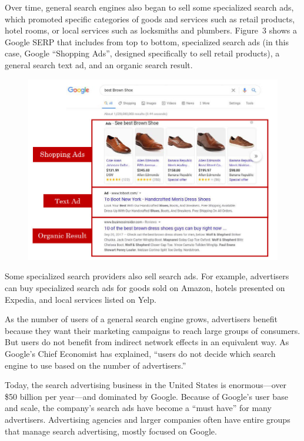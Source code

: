 \documentclass[11pt,b5paper,headings=small]{scrartcl}
\begin{document}
Over time, general search engines also began to sell some specialized search ads,
which promoted specific categories of goods and services such as retail products, 
hotel rooms, or local services such as locksmiths and plumbers. Figure~3 shows a 
Google SERP that includes from top to bottom, specialized search ads (in this case,
Google ``Shopping Ads'', designed specifically to sell retail products), a general 
search text ad, and an organic search result.

\begin{figure}[!ht]
\caption{}
\includegraphics{US-v-Google-Complaint-figures/fig3.png}
\end{figure}



Some specialized search providers also sell search ads. For example, advertisers
can buy specialized search ads for goods sold on Amazon, hotels presented on Expedia, and local
services listed on Yelp.


As the number of users of a general search engine grows, advertisers benefit
because they want their marketing campaigns to reach large groups of consumers. But users do
not benefit from indirect network effects in an equivalent way. As Google’s Chief Economist has
explained, “users do not decide which search engine to use based on the number of advertisers.”


Today, the search advertising business in the United States is enormous—over
\$50 billion per year—and dominated by Google. Because of Google’s user base and scale, the
company’s search ads have become a “must have” for many advertisers. Advertising agencies
and larger companies often have entire groups that manage search advertising, mostly focused on
Google.
\end{document}
